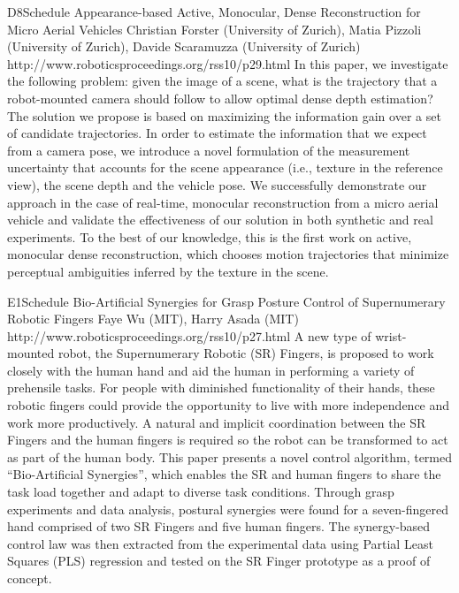\begin{spacing}{1.0}
\descriptionPaper
{D8}{Schedule}
{	
Appearance-based Active, Monocular, Dense Reconstruction for Micro Aerial Vehicles 
}
{
Christian Forster (University of Zurich), Matia Pizzoli (University of Zurich), Davide Scaramuzza (University of Zurich)
}
{
http://www.roboticsproceedings.org/rss10/p29.html
}
{
In this paper, we investigate the following problem: given the image of a scene, what is the trajectory that a robot-mounted camera should follow to allow optimal dense depth estimation? The solution we propose is based on maximizing the information gain over a set of candidate trajectories. In order to estimate the information that we expect from a camera pose, we introduce a novel formulation of the measurement uncertainty that accounts for the scene appearance (i.e., texture in the reference view), the scene depth and the vehicle pose. We successfully demonstrate our approach in the case of real-time, monocular reconstruction from a micro aerial vehicle and validate the effectiveness of our solution in both synthetic and real experiments. To the best of our knowledge, this is the first work on active, monocular dense reconstruction, which chooses motion trajectories that minimize perceptual ambiguities inferred by the texture in the scene.
}



\descriptionPaper
{E1}{Schedule}
{	
Bio-Artificial Synergies for Grasp Posture Control of Supernumerary Robotic Fingers 
}
{
Faye Wu (MIT), Harry Asada (MIT)
}
{
http://www.roboticsproceedings.org/rss10/p27.html
}
{
A new type of wrist-mounted robot, the Supernumerary Robotic (SR) Fingers, is proposed to work closely with the human hand and aid the human in performing a variety of prehensile tasks. For people with diminished functionality of their hands, these robotic fingers could provide the opportunity to live with more independence and work more productively. A natural and implicit coordination between the SR Fingers and the human fingers is required so the robot can be transformed to act as part of the human body. This paper presents a novel control algorithm, termed “Bio-Artificial Synergies”, which enables the SR and human fingers to share the task load together and adapt to diverse task conditions. Through grasp experiments and data analysis, postural synergies were found for a seven-fingered hand comprised of two SR Fingers and five human fingers. The synergy-based control law was then extracted from the experimental data using Partial Least Squares (PLS) regression and tested on the SR Finger prototype as a proof of concept.
}




\end{spacing}
